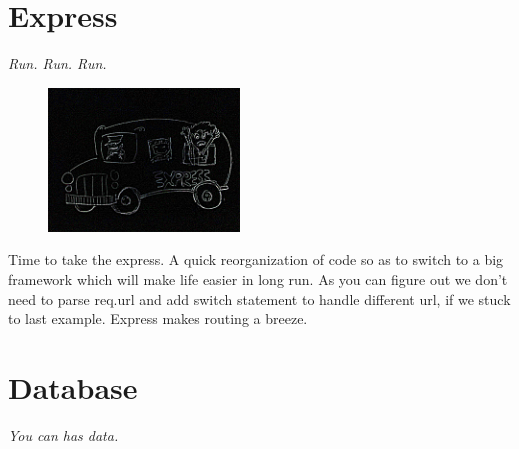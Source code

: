 \documentclass[12pt]{book}
\begin{document}



\chapter{Express}
\begin{flushright}\textit{Run. Run. Run.}\end{flushright}

\begin{figure}
\begin{center}\includegraphics[width=2in]{org/art/fasterEasier.png}\end{center}
\end{figure}

Time to take the express. A quick reorganization of code so as to switch to a big framework which will make life easier in long run. As you can figure out we don't need to parse req.url and add switch statement to handle different url, if we stuck to last example. Express makes routing a breeze.

\vspace{0.6cm}\vspace{0.6cm}



\chapter{Database}
\begin{flushright}\textit{You can has data.}\end{flushright}
\end{document}
